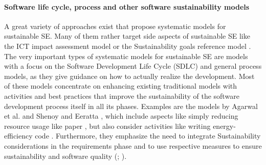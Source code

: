 \documentclass[oribibl]{llncs}
\begin{document}
\paragraph{Software life cycle, process and other software sustainability models}
A great variety of approaches exist that propose systematic models for sustainable SE. Many of them rather target side aspects of sustainable SE like the ICT impact assessment model \cite{hilty_relevance_2006} or the Sustainability goals reference model \cite{penzenstadler_generic_2013}.
 The very important types of systematic models for sustainable SE are models with a focus on the Software Development Life Cycle (SDLC) and general process models, as they give guidance on how to actually realize the development. Most of these models concentrate on enhancing existing traditional models with activities and best practices that improve the sustainability of the software development process itself in all its phases. Examples are the models by Agarwal et al. \cite{agarwal_sustainable_2012} and Shenoy and Eeratta \cite{shenoy_green_2011}, which include aspects like simply reducing resource usage like paper \cite{shenoy_green_2011}, but also consider activities like writing energy-efficiency code \cite{agarwal_sustainable_2012}. Furthermore, they emphasize the need to integrate Sustainability considerations in the requirements phase and to use respective measures to ensure sustainability and software quality (\cite{agarwal_sustainable_2012}; \cite{shenoy_green_2011}).\\ %
\end{document}
